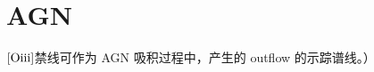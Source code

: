 \documentclass[../天体物理基础.tex]{subfiles}
\begin{document}
\section{AGN}
$\left[\mathrm{O\uppercase\expandafter{\romannumeral3}}\right]$禁线可作为 AGN 吸积过程中，产生的 outflow 的示踪谱线。）

\printbibliography
\end{document}
